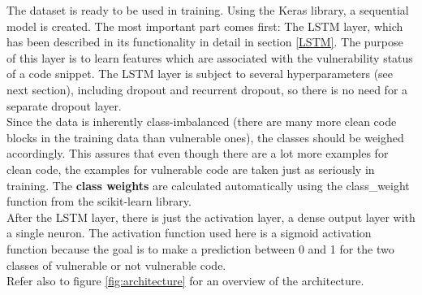 \documentclass[
a4paper,
pagesize,
pdftex,
12pt,
twoside, %
BCOR=5mm, %
ngerman,
fleqn,
final,
]{scrartcl}
\begin{document}
	The dataset is ready to be used in training. Using the Keras library, a sequential model is created. The most important part comes first: The LSTM layer, which has been described in its functionality in detail in section \ref{LSTM}. The purpose of this layer is to learn features which are associated with the vulnerability status of a code snippet. The LSTM layer is subject to several hyperparameters (see next section), including dropout and recurrent dropout, so there is no need for a separate dropout layer. \\
	Since the data is inherently class-imbalanced (there are many more clean code blocks in the training data than vulnerable ones), the classes should be weighed accordingly. This assures that even though there are a lot more examples for clean code, the examples for vulnerable code are taken just as seriously in training. The \textbf{class weights} are calculated automatically using the class\_weight function from the scikit-learn library.\\
	After the LSTM layer, there is just the activation layer, a dense output layer with a single neuron. The activation function used here is a sigmoid activation function because the goal is to make a prediction between 0 and 1 for the two classes of vulnerable or not vulnerable code.\\
	Refer also to figure \ref{fig:architecture} for an overview of the architecture.
	
\end{document}
